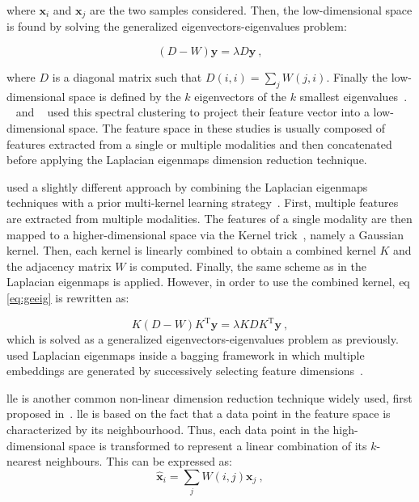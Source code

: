 \noindent where $\mathbf{x}_i$ and $\mathbf{x}_j$ are the two samples considered.
Then, the low-dimensional space is found by solving the generalized
eigenvectors-eigenvalues problem:

\begin{equation}
  (D-W)\mathbf{y} = \lambda D \mathbf{y} \ ,
  \label{eq:geeig}
\end{equation}

\noindent where $D$ is a diagonal matrix such that $D(i,i) = \sum_j W(j,i)$.
Finally the low-dimensional space is defined by the $k$ eigenvectors of the $k$
smallest eigenvalues~\cite{Belkin2001}.
\citeauthor{Tiwari2009a}~\cite{Tiwari2007,Tiwari2009,Tiwari2009a} and
\citeauthor{Viswanath2008}~\cite{Viswanath2008} used this spectral clustering
to project their feature vector into a low-dimensional space.
The feature space in these studies is usually composed of features extracted
from a single or multiple modalities and then concatenated before applying the
Laplacian eigenmaps dimension reduction technique.

\citeauthor{Tiwari2013} used a slightly different approach by combining the
Laplacian eigenmaps techniques with a prior multi-kernel learning
strategy~\cite{Tiwari2009,Tiwari2013}.
First, multiple features are extracted from multiple modalities.
The features of a single modality are then mapped to a higher-dimensional space
via the Kernel trick~\cite{Aizerman1964}, namely a Gaussian kernel.
Then, each kernel is linearly combined to obtain a combined kernel $K$ and the
adjacency matrix $W$ is computed.
Finally, the same scheme as in the Laplacian eigenmaps is applied.
However, in order to use the combined kernel, \acs{eq}\,\eqref{eq:geeig} is
rewritten as:

\begin{equation}
  K (D-W) K^{\text{T}} \mathbf{y} = \lambda K D K^{\text{T}} \mathbf{y} \ ,
  \label{eq:sesmik}
\end{equation}
\noindent which is solved as a generalized eigenvectors-eigenvalues problem as
previously.
\citeauthor{Viswanath2011} used Laplacian eigenmaps inside a bagging framework
in which multiple embeddings are generated by successively selecting feature
dimensions~\cite{Viswanath2011}.

\Ac{lle} is another common non-linear dimension reduction technique widely
used, first proposed in~\cite{Roweis2000}.
\ac{lle} is based on the fact that a data point in the feature space is
characterized by its neighbourhood.
Thus, each data point in the high-dimensional space is transformed to represent
a linear combination of its $k$-nearest neighbours.
This can be expressed as:
\begin{equation}
  \hat{\mathbf{x}}_i = \sum_j W(i,j) \mathbf{x}_j \ ,
  \label{eq:lincomlle}
\end{equation}

